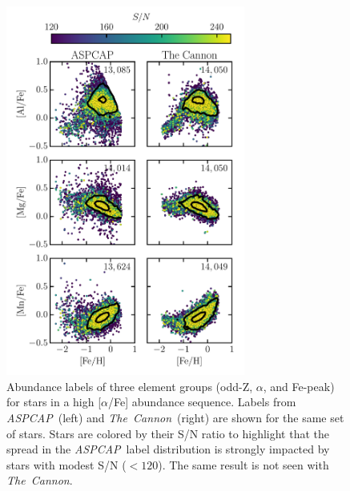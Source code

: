 \documentclass[12pt,preprint]{aastex}
\newcommand{\project}[1]{\textsl{#1}}
\newcommand{\TheCannon}{\project{The~Cannon}}
\newcommand{\acronym}[1]{{\small{#1}}}
\newcommand{\aspcap}{\project{\acronym{ASPCAP}}}
\begin{document}
\clearpage

\begin{figure}[p]
\centering
\includegraphics[width=0.7\textwidth]{high-alpha-sequence.pdf}
\caption{Abundance labels of three element groups (odd-Z, $\alpha$, and Fe-peak) for stars in a high [$\alpha$/Fe] abundance sequence. Labels from \aspcap\ (left) and \TheCannon\ (right) are shown for the same set of stars. Stars are colored by their S/N ratio to highlight that the spread in the \aspcap\ label distribution is strongly impacted by stars with modest S/N ($<120$). The same result is not seen with \TheCannon.\label{fig:high-alpha-sequence}}
\end{figure}

\clearpage
\end{document}
